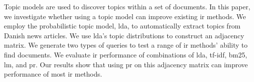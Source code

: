 Topic models are used to discover topics within a set of documents.
In this paper, we investigate whether using a topic model can improve existing \acrlong{ir} methods.
We employ the probabilistic topic model, \acrlong{lda}, to automatically extract topics from Danish news articles.
We use \acrlong{lda}'s topic distributions to construct an adjacency matrix.
We generate two types of queries to test a range of \acrlong{ir} methods' ability to find documents.
We evaluate \acrlong{ir} performance of combinations of \acrlong{lda}, \acrlong{tf-idf}, \acrlong{bm25}, \acrlong{lm}, and \acrlong{pr}.
Our results show that using \acrlong{pr} on this adjacency matrix can improve performance of most \acrlong{ir} methods.
